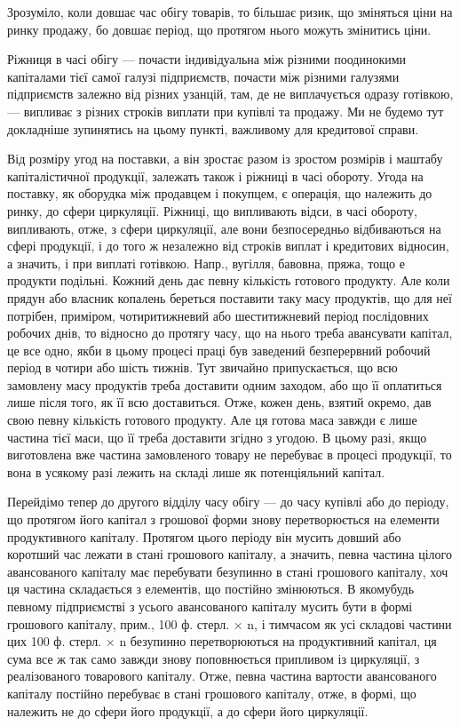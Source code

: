 Зрозуміло, коли довшає час обігу товарів, то більшає ризик, що
зміняться ціни на ринку продажу, бо довшає період, що протягом нього
можуть змінитись ціни.

Ріжниця в часі обігу — почасти індивідуальна між різними поодинокими
капіталами тієї самої галузі підприємств, почасти між різними галузями
підприємств залежно від різних узанцій, там, де не виплачується
одразу готівкою, — випливає з різних строків виплати при купівлі та
продажу. Ми не будемо тут докладніше зупинятись на цьому пункті,
важливому для кредитової справи.

Від розміру угод на поставки, а він зростає разом із зростом розмірів
і маштабу капіталістичної продукції, залежать також і ріжниці в часі
обороту. Угода на поставку, як оборудка між продавцем і покупцем, є
операція, що належить до ринку, до сфери циркуляції. Ріжниці, що випливають
відси, в часі обороту, випливають, отже, з сфери циркуляції,
але вони безпосередньо відбиваються на сфері продукції, і до того ж
незалежно від строків виплат і кредитових відносин, а значить, і при виплаті
готівкою. Напр., вугілля, бавовна, пряжа, тощо е продукти подільні.
Кожний день дає певну кількість готового продукту. Але коли прядун
або власник копалень береться поставити таку масу продуктів, що для
неї потрібен, приміром, чотиритижневий або шеститижневий період послідовних
робочих днів, то відносно до протягу часу, що на нього треба
авансувати капітал, це все одно, якби в цьому процесі праці був заведений
безперервний робочий період в чотири або шість тижнів. Тут звичайно
припускається, що всю замовлену масу продуктів треба доставити
одним заходом, або що її оплатиться лише після того, як її всю доставиться.
Отже, кожен день, взятий окремо, дав свою певну кількість готового
продукту. Але ця готова маса завжди є лише частина тієї маси,
що її треба доставити згідно з угодою. В цьому разі, якщо виготовлена
вже частина замовленого товару не перебуває в процесі продукції, то
вона в усякому разі лежить на складі лише як потенціяльний капітал.

Перейдімо тепер до другого відділу часу обігу — до часу купівлі або
до періоду, що протягом його капітал з грошової форми знову перетворюється
на елементи продуктивного капіталу. Протягом цього періоду
він мусить довший або коротший час лежати в стані грошового капіталу,
а значить, певна частина цілого авансованого капіталу має перебувати
безупинно в стані грошового капіталу, хоч ця частина складається з елементів,
що постійно змінюються. В якомубудь певному підприємстві з
усього авансованого капіталу мусить бути в формі грошового капіталу,
прим., 100 ф. стерл. × n, і тимчасом як усі складові частини цих 100 ф.
стерл. × n безупинно перетворюються на продуктивний капітал, ця сума
все ж так само завжди знову поповнюється припливом із циркуляції, з реалізованого
товарового капіталу. Отже, певна частина вартости авансованого
капіталу постійно перебуває в стані грошового капіталу, отже, в формі,
що належить не до сфери його продукції, а до сфери його циркуляції.

